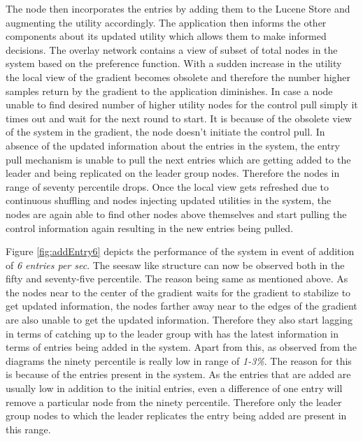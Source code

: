\documentclass[12pt,a4paper,twoside,openright]{book}
\begin{document}
\par The node then incorporates the entries by adding them to the Lucene Store and augmenting the utility accordingly. The application then informs the other components about its updated utility which allows them to make informed decisions. The overlay network contains a view of subset of total nodes in the system based on the preference function. With a sudden increase in the utility the local view of the gradient becomes obsolete and therefore the number higher samples return by the gradient to the application diminishes. In case a node unable to find desired number of higher utility nodes for the control pull simply it times out and wait for the next round to start. It is because of the obsolete view of the system in the gradient, the node doesn't initiate the control pull. In absence of the updated information about the entries in the system, the entry pull mechanism is unable to pull the next entries which are getting added to the leader and being replicated on the leader group nodes. Therefore the nodes in range of seventy percentile drops. Once the local view gets refreshed due to continuous shuffling and nodes injecting updated utilities in the system, the nodes are again able to find other nodes above themselves and start pulling the control information again resulting in the new entries being pulled.

\par Figure \ref{fig:addEntry6} depicts the performance of the system in event of addition of \textit{6 entries per sec}. The seesaw like structure can now be observed both in the fifty and seventy-five percentile. The reason being same as mentioned above. As the nodes near to the center of the gradient waits for the gradient to stabilize to get updated information, the nodes farther away near to the edges of the gradient are also unable to get the updated information. Therefore they also start lagging in terms of catching up to the leader group with has the latest information in terms of entries being added in the system. Apart from this, as observed from the diagrams the ninety percentile is really low in range of \textit{1-3\%}. The reason for this is because of the entries present in the system. As the entries that are added are usually low in addition to the initial entries, even a difference of one entry will remove a particular node from the ninety percentile. Therefore only the leader group nodes to which the leader replicates the entry being added are present in this range.
\end{document}
